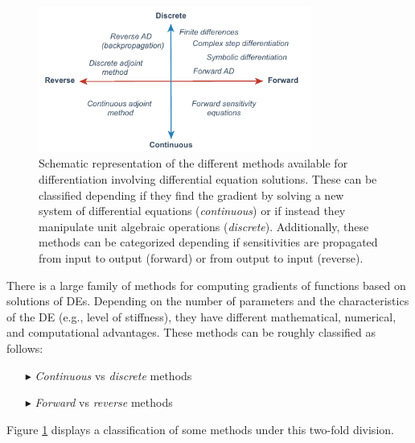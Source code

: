 \begin{figure}[t]
    \centering
    \includegraphics[width=0.80\textwidth]{figures/scheme-methods.pdf}
    \caption{Schematic representation of the different methods available for differentiation involving differential equation solutions. These can be classified depending if they find the gradient by solving a new system of differential equations (\textit{continuous}) or if instead they manipulate unit algebraic operations (\textit{discrete}). Additionally, these methods can be categorized depending if sensitivities are propagated from input to output (forward) or from output to input (reverse).}
    \label{fig:scheme-all-methods}
\end{figure}

There is a large family of methods for computing gradients of functions based on solutions of DEs. 
Depending on the number of parameters and the characteristics of the DE (e.g., level of stiffness), they have different mathematical, numerical, and computational advantages.
These methods can be roughly classified as follows: 
\begin{itemize}
    \item[$\blacktriangleright$] \textit{Continuous} vs \textit{discrete}  methods
    \item[$\blacktriangleright$] \textit{Forward} vs \textit{reverse} methods
\end{itemize}
Figure \ref{fig:scheme-all-methods} displays a classification of some methods under this two-fold division. 

